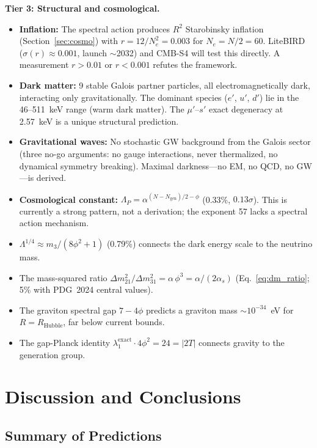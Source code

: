 \documentclass[12pt,a4paper]{article}
\theoremstyle{definition}
\begin{document}
\textbf{Tier 3: Structural and cosmological.}
\begin{itemize}
\item \textbf{Inflation:} The spectral action produces $R^2$ Starobinsky inflation (Section~\ref{sec:cosmo}) with $r = 12/N_e^2 = 0.003$ for $N_e = N/2 = 60$.  LiteBIRD~\cite{LiteBIRD2023} ($\sigma(r) \approx 0.001$, launch $\sim$2032) and CMB-S4 will test this directly.  A measurement $r > 0.01$ or $r < 0.001$ refutes the framework.
\item \textbf{Dark matter:} 9 stable Galois partner particles, all electromagnetically dark, interacting only gravitationally.  The dominant species ($e'$, $u'$, $d'$) lie in the 46--511~keV range (warm dark matter).  The $\mu'$--$s'$ exact degeneracy at 2.57~keV is a unique structural prediction.
\item \textbf{Gravitational waves:} No stochastic GW background from the Galois sector (three no-go arguments: no gauge interactions, never thermalized, no dynamical symmetry breaking).  Maximal darkness---no EM, no QCD, no GW---is derived.
\item \textbf{Cosmological constant:} $\Lambda_P = \alpha^{(N - N_{\text{gen}})/2 - \phi}$ (0.33\%, $0.13\sigma$).  This is currently a strong pattern, not a derivation; the exponent 57 lacks a spectral action mechanism.
\item $\Lambda^{1/4} \approx m_3 / (8\phi^2 + 1)$ (0.79\%) connects the dark energy scale to the neutrino mass.
\item The mass-squared ratio $\Delta m^2_{21}/\Delta m^2_{31} = \alpha\,\phi^3 = \alpha/(2\alpha_s)$ (Eq.~\ref{eq:dm_ratio}; 5\% with PDG~2024 central values).
\item The graviton spectral gap $7 - 4\phi$ predicts a graviton mass $\sim 10^{-34}$~eV for $R = R_{\text{Hubble}}$, far below current bounds.
\item The gap-Planck identity $\lambda_1^{\text{exact}} \cdot 4\phi^2 = 24 = |2T|$ connects gravity to the generation group.
\end{itemize}


\section{Discussion and Conclusions}
\label{sec:discussion}

\subsection{Summary of Predictions}
\end{document}
